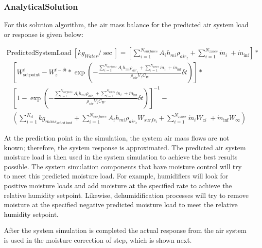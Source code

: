 \subsubsection{AnalyticalSolution}\label{analyticalsolution-001}

For this solution algorithm, the air mass balance for the predicted air system load or response is given below:

\begin{equation}
\begin{array}{l}{\mathrm{PredictedSystemLoad}}\;[k{g_{Water}}/\sec ] = \left[ {\sum\limits_{i = 1}^{{N_{surfaces}}} {{A_i}{h_{mi}}} {\rho_{ai{r_z}}} + \sum\limits_{i = 1}^{{N_{zones}}} {{{\dot m}_i}} \; + {{\dot m}_{\inf }}} \right]*\\\;\;\;\left[ {W_{{\mathrm{setpoint}}}^t - W_z^{t - \delta t}*\exp \left( { - \frac{{\sum\limits_{i = 1}^{{N_{surfaces}}} {{A_i}{h_{mi}}} {\rho_{ai{r_z}}} + \sum\limits_{i = 1}^{{N_{zones}}} {{{\dot m}_i}} \; + {{\dot m}_{\inf }}}}{{{\rho_{air}}{V_z}{C_W}}}\delta t} \right)} \right]*\\\;\;\;{\left[ {1 - \exp \left( { - \frac{{\sum\limits_{i = 1}^{{N_{surfaces}}} {{A_i}{h_{mi}}} {\rho_{ai{r_z}}} + \sum\limits_{i = 1}^{{N_{zones}}} {{{\dot m}_i}} \; + {{\dot m}_{\inf }}}}{{{\rho_{air}}{V_z}{C_W}}}\delta t} \right)} \right]^{ - 1}} - \\\;\;\;\left( {\sum\limits_{i = 1}^{{N_{sl}}} {k{g_{mas{s_{sched\;load}}}}} + \sum\limits_{i = 1}^{{N_{surfaces}}} {{A_i}{h_{mi}}} {\rho_{ai{r_z}}}{W_{surf{s_i}}} + \sum\limits_{i = 1}^{{N_{zones}}} {{{\dot m}_i}} {W_{zi}}\; + {{\dot m}_{\inf }}{W_\infty }} \right)\end{array}
\end{equation}

At the prediction point in the simulation, the system air mass flows are not known; therefore, the system response is approximated. The predicted air system moisture load is then used in the system simulation to achieve the best results possible. The system simulation components that have moisture control will try to meet this predicted moisture load. For example, humidifiers will look for positive moisture loads and add moisture at the specified rate to achieve the relative humidity setpoint. Likewise, dehumidification processes will try to remove moisture at the specified negative predicted moisture load to meet the relative humidity setpoint.

After the system simulation is completed the actual response from the air system is used in the moisture correction of step, which is shown next.


